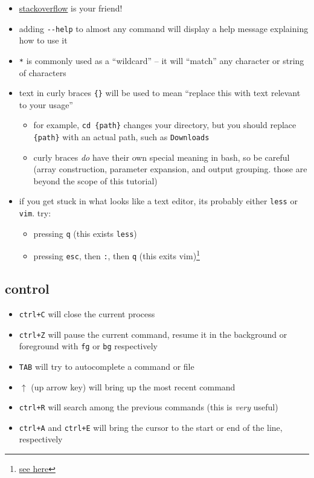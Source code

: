 \documentclass[
]{article}
\providecommand{\tightlist}{%
  \setlength{\itemsep}{0pt}\setlength{\parskip}{0pt}}
\begin{document}
\begin{itemize}
\tightlist
\item
  \href{https://stackoverflow.com}{stackoverflow} is your friend!
\item
  adding \texttt{-\/-help} to almost any command will display a help
  message explaining how to use it
\item
  \texttt{*} is commonly used as a ``wildcard'' -- it will ``match'' any
  character or string of characters
\item
  text in curly braces \texttt{\{\}} will be used to mean ``replace this
  with text relevant to your usage''

  \begin{itemize}
  \tightlist
  \item
    for example, \texttt{cd\ \{path\}} changes your directory, but you
    should replace \texttt{\{path\}} with an actual path, such as
    \texttt{Downloads}
  \item
    curly braces \emph{do} have their own special meaning in bash, so be
    careful (array construction, parameter expansion, and output
    grouping. those are beyond the scope of this tutorial)
  \end{itemize}
\item
  if you get stuck in what looks like a text editor, its probably either
  \texttt{less} or \texttt{vim}. try:

  \begin{itemize}
  \tightlist
  \item
    pressing \texttt{q} (this exists \texttt{less})
  \item
    pressing \texttt{esc}, then \texttt{:}, then \texttt{q} (this exits
    vim)\footnote{\href{https://twitter.com/ctrlshifti/status/1282199281982533637}{see
      here}}
  \end{itemize}
\end{itemize}

\hypertarget{control}{%
\subsection{control}\label{control}}

\begin{itemize}
\tightlist
\item
  \texttt{ctrl+C} will close the current process
\item
  \texttt{ctrl+Z} will pause the current command, resume it in the
  background or foreground with \texttt{fg} or \texttt{bg} respectively
\item
  \texttt{TAB} will try to autocomplete a command or file
\item
  \(\uparrow\) (up arrow key) will bring up the most recent command
\item
  \texttt{ctrl+R} will search among the previous commands (this is
  \emph{very} useful)
\item
  \texttt{ctrl+A} and \texttt{ctrl+E} will bring the cursor to the start
  or end of the line, respectively
\end{itemize}
\end{document}
